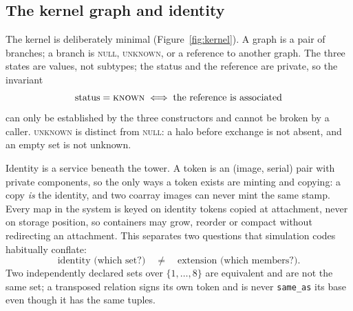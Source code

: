 \documentclass[11pt,a4paper]{article}
\newcommand{\code}[1]{\texttt{#1}}
\begin{document}
\subsection{The kernel graph and identity}\label{sec:kernel}

The kernel is deliberately minimal (Figure~\ref{fig:kernel}). A graph is a pair of branches; a branch is \textsc{null}, \textsc{unknown}, or a reference to another graph. The three states are values, not subtypes; the status and the reference are private, so the invariant
\[
\text{status} = \textsc{known} \iff \text{the reference is associated}
\]
can only be established by the three constructors and cannot be broken by a caller. \textsc{unknown} is distinct from \textsc{null}: a halo before exchange is not absent, and an empty set is not unknown.

Identity is a service beneath the tower. A token is an (image, serial) pair with private components, so the only ways a token exists are minting and copying: a copy \emph{is} the identity, and two coarray images can never mint the same stamp. Every map in the system is keyed on identity tokens copied at attachment, never on storage position, so containers may grow, reorder or compact without redirecting an attachment. This separates two questions that simulation codes habitually conflate:
\[
\text{identity (which set?)} \quad\neq\quad \text{extension (which members?)}.
\]
Two independently declared sets over $\{1,\dots,8\}$ are equivalent and are not the same set; a transposed relation signs its own token and is never \code{same\_as} its base even though it has the same tuples.
\end{document}
